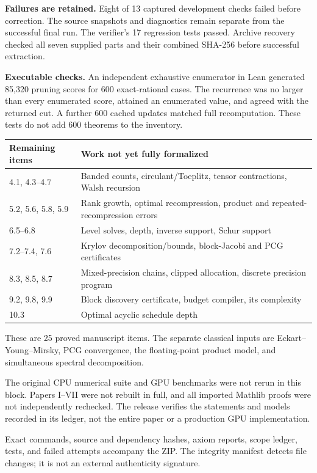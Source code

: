 \documentclass[11pt]{article}
\begin{document}
\textbf{Failures are retained.} Eight of 13 captured development checks failed before correction. The source snapshots and diagnostics remain separate from the successful final run. The verifier's 17 regression tests passed. Archive recovery checked all seven supplied parts and their combined SHA-256 before successful extraction.

\textbf{Executable checks.} An independent exhaustive enumerator in Lean generated 85,320 pruning scores for 600 exact-rational cases. The recurrence was no larger than every enumerated score, attained an enumerated value, and agreed with the returned cut. A further 600 cached updates matched full recomputation. These tests do not add 600 theorems to the inventory.

\begin{center}\small
\renewcommand{\arraystretch}{1.2}
\begin{tabular}{@{}p{}p{}@{}}
\toprule
Remaining items & Work not yet fully formalized\\
\midrule
4.1, 4.3--4.7 & Banded counts, circulant/Toeplitz, tensor contractions, Walsh recursion\\
5.2, 5.6, 5.8, 5.9 & Rank growth, optimal recompression, product and repeated-recompression errors\\
6.5--6.8 & Level solves, depth, inverse support, Schur support\\
7.2--7.4, 7.6 & Krylov decomposition/bounds, block-Jacobi and PCG certificates\\
8.3, 8.5, 8.7 & Mixed-precision chains, clipped allocation, discrete precision program\\
9.2, 9.8, 9.9 & Block discovery certificate, budget compiler, its complexity\\
10.3 & Optimal acyclic schedule depth\\
\bottomrule
\end{tabular}
\end{center}
These are 25 proved manuscript items. The separate classical inputs are Eckart--Young--Mirsky, PCG convergence, the floating-point product model, and simultaneous spectral decomposition.

The original CPU numerical suite and GPU benchmarks were not rerun in this block. Papers I--VII were not rebuilt in full, and all imported Mathlib proofs were not independently rechecked. The release verifies the statements and models recorded in its ledger, not the entire paper or a production GPU implementation.

Exact commands, source and dependency hashes, axiom reports, scope ledger, tests, and failed attempts accompany the ZIP. The integrity manifest detects file changes; it is not an external authenticity signature.
\end{document}
